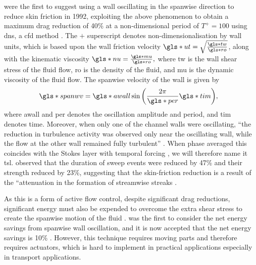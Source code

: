 \citeauthor*{jung1992} \cite{jung1992} were the first to suggest using a wall oscillating in the spanwise direction to reduce skin friction in 1992, exploiting the above phenomenon to obtain a maximum drag reduction of 40\% at a non-dimensional period of $T^+=100$ using \gls{dns}, a \gls{cfd} method \cite{karniadakis2003}. The $+$ superscript denotes non-dimensionalisation by wall units, which is based upon the wall friction velocity $\gls*{ut}=\sqrt{\frac{\gls*{tw}}{\gls*{ro}}}$, along with the kinematic viscosity $\gls*{nu}=\frac{\gls*{mu}}{\gls*{ro}},$ where \gls*{tw} is the wall shear stress of the fluid flow, \gls*{ro} is the density of the fluid, and \gls*{mu} is the dynamic viscosity of the fluid flow. The spanwise velocity of the wall is given by
\begin{equation}
	\gls*{spanwv} = \gls*{awall}\sin{\left( \frac{2\pi}{\gls*{per}}\gls*{tim} \right)}
,\end{equation}
where \gls*{awall} and \gls*{per} denotes the oscillation amplitude and period, and \gls*{tim} denotes time.
Moreover, when only one of the channel walls were oscillating, ``the reduction in turbulence activity was observed only near the oscillating wall, while the flow at the other wall remained fully turbulent'' \cite{jung1992}. When phase averaged this coincides with the Stokes layer with temporal forcing \cite{viotti2009}, we will therefore name it \gls{tsl}. \textcite{dhanak1999} observed that the duration of sweep events were reduced by 47\% and their strength reduced by 23\%, suggesting that the skin-friction reduction is a result of the ``attenuation in the formation of streamwise streaks \cite{karniadakis2003}.

As this is a form of active flow control, despite significant drag reductions, significant energy must also be expended to overcome the extra shear stress to create the spanwise motion of the fluid \cite{viotti2009}. \textcite{baron1996} was the first to consider the net energy savings from spanwise wall oscillation, and it is now accepted that the net energy savings is 10\% \cite{viotti2009, karniadakis2003}. However, this technique requires moving parts and therefore requires actuators, which is hard to implement in practical applications especially in transport applications.


